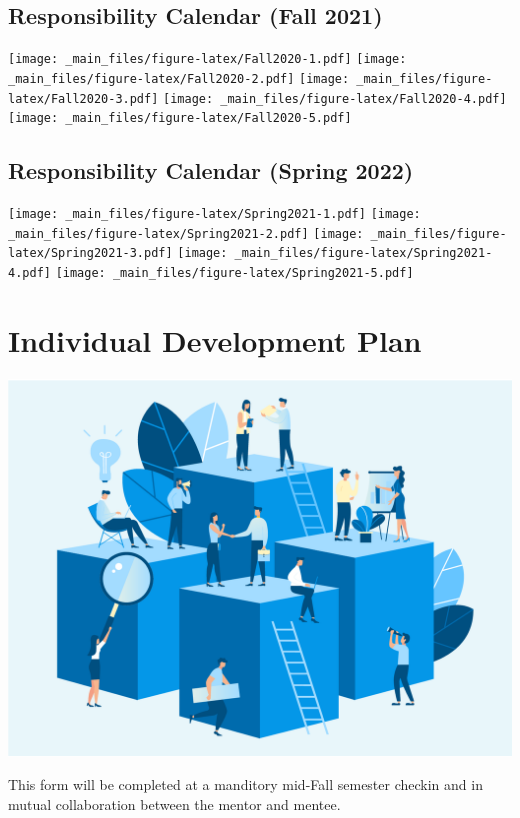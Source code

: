 \documentclass[
  openany]{book}
\begin{document}
\hypertarget{fall20}{%
\section{Responsibility Calendar (Fall 2021)}\label{fall20}}

\texttt{[image: \_main\_files/figure-latex/Fall2020-1.pdf]} \texttt{[image: \_main\_files/figure-latex/Fall2020-2.pdf]} \texttt{[image: \_main\_files/figure-latex/Fall2020-3.pdf]} \texttt{[image: \_main\_files/figure-latex/Fall2020-4.pdf]} \texttt{[image: \_main\_files/figure-latex/Fall2020-5.pdf]}

\hypertarget{spring20}{%
\section{Responsibility Calendar (Spring 2022)}\label{spring20}}

\texttt{[image: \_main\_files/figure-latex/Spring2021-1.pdf]} \texttt{[image: \_main\_files/figure-latex/Spring2021-2.pdf]} \texttt{[image: \_main\_files/figure-latex/Spring2021-3.pdf]} \texttt{[image: \_main\_files/figure-latex/Spring2021-4.pdf]} \texttt{[image: \_main\_files/figure-latex/Spring2021-5.pdf]}

\hypertarget{sdp}{%
\chapter{Individual Development Plan}\label{sdp}}

\includegraphics{images/idp.png}

This form will be completed at a manditory mid-Fall semester checkin and in mutual collaboration between the mentor and mentee.
\end{document}
